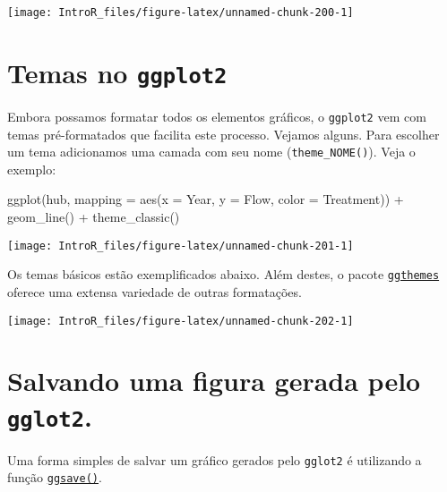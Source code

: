 \documentclass[
]{book}
\newenvironment{Shaded}{\begin{snugshade}}{\end{snugshade}}
\newcommand{\AttributeTok}[1]{\textcolor[rgb]{0.77,0.63,0.00}{#1}}
\newcommand{\FunctionTok}[1]{\textcolor[rgb]{0.00,0.00,0.00}{#1}}
\newcommand{\NormalTok}[1]{#1}
\newcommand{\SpecialCharTok}[1]{\textcolor[rgb]{0.00,0.00,0.00}{#1}}
\begin{document}
\begin{center}\texttt{[image: IntroR\_files/figure-latex/unnamed-chunk-200-1]} \end{center}

\hypertarget{temas-no-ggplot2}{%
\section{\texorpdfstring{Temas no \texttt{ggplot2}}{Temas no ggplot2}}\label{temas-no-ggplot2}}

Embora possamos formatar todos os elementos gráficos, o \texttt{ggplot2} vem com temas pré-formatados que facilita este processo. Vejamos alguns. Para escolher um tema adicionamos uma camada com seu nome (\texttt{theme\_NOME()}). Veja o exemplo:

\begin{Shaded}
\begin{Highlighting}[]
\FunctionTok{ggplot}\NormalTok{(hub, }\AttributeTok{mapping =} \FunctionTok{aes}\NormalTok{(}\AttributeTok{x =}\NormalTok{ Year, }\AttributeTok{y =}\NormalTok{ Flow, }\AttributeTok{color =}\NormalTok{ Treatment)) }\SpecialCharTok{+}
  \FunctionTok{geom\_line}\NormalTok{() }\SpecialCharTok{+}
  \FunctionTok{theme\_classic}\NormalTok{()}
\end{Highlighting}
\end{Shaded}

\begin{center}\texttt{[image: IntroR\_files/figure-latex/unnamed-chunk-201-1]} \end{center}

Os temas básicos estão exemplificados abaixo. Além destes, o pacote \href{https://cran.r-project.org/web/packages/ggthemes/index.html}{\texttt{ggthemes}} oferece uma extensa variedade de outras formatações.

\begin{center}\texttt{[image: IntroR\_files/figure-latex/unnamed-chunk-202-1]} \end{center}

\hypertarget{salvando-uma-figura-gerada-pelo-gglot2.}{%
\section{\texorpdfstring{Salvando uma figura gerada pelo \texttt{gglot2}.}{Salvando uma figura gerada pelo gglot2.}}\label{salvando-uma-figura-gerada-pelo-gglot2.}}

Uma forma simples de salvar um gráfico gerados pelo \texttt{gglot2} é utilizando a função \href{https://ggplot2.tidyverse.org/reference/ggsave.html}{\texttt{ggsave()}}.
\end{document}

